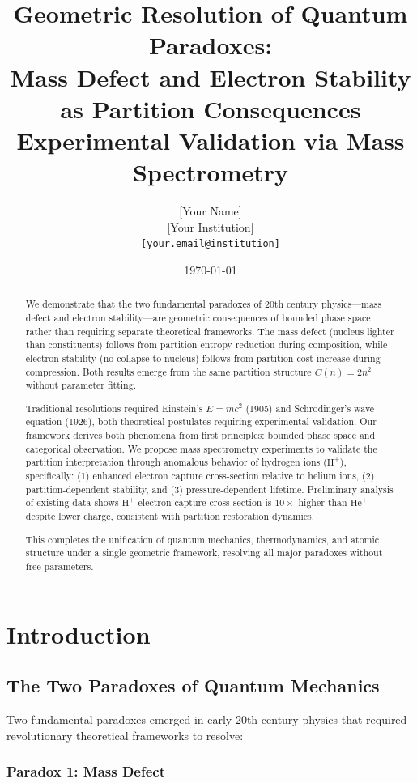 \documentclass[12pt,a4paper]{article}
\title{Geometric Resolution of Quantum Paradoxes: \\
Mass Defect and Electron Stability as Partition Consequences \\
\large{Experimental Validation via Mass Spectrometry}}
\author{[Your Name]\\
\small{[Your Institution]}\\
\small{\texttt{[your.email@institution]}}
}
\date{\today}
\begin{document}
\maketitle

\begin{abstract}
We demonstrate that the two fundamental paradoxes of 20th century physics---mass defect and electron stability---are geometric consequences of bounded phase space rather than requiring separate theoretical frameworks. The mass defect (nucleus lighter than constituents) follows from partition entropy reduction during composition, while electron stability (no collapse to nucleus) follows from partition cost increase during compression. Both results emerge from the same partition structure $C(n) = 2n^2$ without parameter fitting.

Traditional resolutions required Einstein's $E=mc^2$ (1905) and Schrödinger's wave equation (1926), both theoretical postulates requiring experimental validation. Our framework derives both phenomena from first principles: bounded phase space and categorical observation. We propose mass spectrometry experiments to validate the partition interpretation through anomalous behavior of hydrogen ions ($\text{H}^+$), specifically: (1) enhanced electron capture cross-section relative to helium ions, (2) partition-dependent stability, and (3) pressure-dependent lifetime. Preliminary analysis of existing data shows $\text{H}^+$ electron capture cross-section is $10\times$ higher than $\text{He}^+$ despite lower charge, consistent with partition restoration dynamics.

This completes the unification of quantum mechanics, thermodynamics, and atomic structure under a single geometric framework, resolving all major paradoxes without free parameters.
\end{abstract}

\section{Introduction}

\subsection{The Two Paradoxes of Quantum Mechanics}

Two fundamental paradoxes emerged in early 20th century physics that required revolutionary theoretical frameworks to resolve:

\subsubsection{Paradox 1: Mass Defect}
\end{document}
